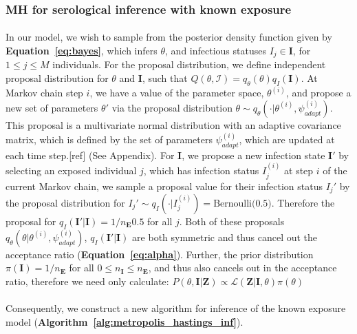 \documentclass{article}
\begin{document}
\subsubsection{MH for serological inference with known exposure }

\paragraph{}In our model, we wish to sample from the posterior density function given by \textbf{Equation~\ref{eq:bayes}}, which infers $\theta$, and infectious statuses ${I_j} \in \mathbf{I}$, for $1 \leq j \leq M$ individuals. For the proposal distribution, we define independent proposal distribution for $\theta$ and $\mathbf{I}$,  such that $Q(\theta, \mathcal{I}) = q_\theta(\theta)q_I(\mathbf{I})$. At Markov chain step $i$, we have a value of the parameter space, $\theta^{(i)}$, and propose a new set of parameters $\theta'$ via the proposal distribution $\theta \sim q_\theta(\cdot | \theta^{(i)}, \psi^{(i)}_{adapt})$. This proposal is a multivariate normal distribution with an adaptive covariance matrix, which is defined by the set of parameters $\psi^{(i)}_{adapt}$, which are updated at each time step.[ref] (See Appendix). For $\mathbf{I}$, we propose a new infection state $\mathbf{I}'$ by selecting an exposed individual $j$, which has infection status $I_j^{(i)}$ at step $i$ of the current Markov chain, we sample a proposal value for their infection status $I_j'$ by the proposal distribution for $I_j' \sim q_I(\cdot | I^{(i)}_j)= \text{Bernoulli(0.5)}$. Therefore the proposal for $q_I(\mathbf{I}'|\mathbf{I}) = 1/n_\mathbf{E}0.5$ for all $j$. Both of these proposals $q_\theta\left(\theta | \theta^{(i)}, \psi^{(i)}_{adapt}\right)$, $q_I(\mathbf{I}'|\mathbf{I})$ are both symmetric and thus cancel out the acceptance ratio (\textbf{Equation~\ref{eq:alpha}}). Further, the prior distribution $\pi(\mathbf{I}) = 1 / n_\mathbf{E}$ for all $0 \leq n_\mathbf{I} \leq n_\mathbf{E}$, and thus also cancels out in the acceptance ratio, therefore we need only calculate: $P(\theta, \mathbf{I} | \mathbf{Z}) \propto \mathcal{L}(\mathbf{Z} | \mathbf{I}, \theta)\pi(\theta)$

\paragraph{}Consequently, we construct a new algorithm for inference of the known exposure model (\textbf{Algorithm~\ref{alg:metropolis_hastings_inf}}).
\end{document}
